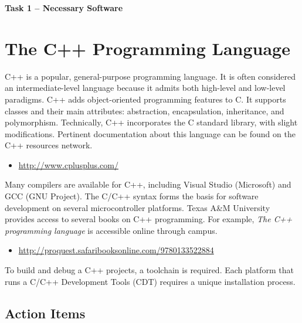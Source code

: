 \documentclass[11pt]{article}
\begin{document}
\begin{center}
{\bfseries \LARGE Task 1 -- Necessary Software\\[8mm]}
\end{center}


\section{The C++ Programming Language}

C++ is a popular, general-purpose programming language.
It is often considered an intermediate-level language because it admits both high-level and low-level paradigms.
C++ adds object-oriented programming features to C.
It supports classes and their main attributes: abstraction, encapsulation, inheritance, and polymorphism.
Technically, C++ incorporates the C standard library, with slight modifications.
Pertinent documentation about this language can be found on the C++ resources network.
\begin{itemize}
\item \url{http://www.cplusplus.com/}
\end{itemize}
Many compilers are available for C++, including Visual Studio (Microsoft) and GCC (GNU Project).
The C/C++ syntax forms the basis for software development on several microcontroller platforms.
Texas A\&M University provides access to several books on C++ programming.
For example, \emph{The C++ programming language} is accessible online through campus.
\begin{itemize}
\item \url{http://proquest.safaribooksonline.com/9780133522884}
\end{itemize}
To build and debug a C++ projects, a toolchain is required.
Each platform that runs a C/C++ Development Tools (CDT) requires a unique installation process.


\subsection*{Action Items}
\end{document}
